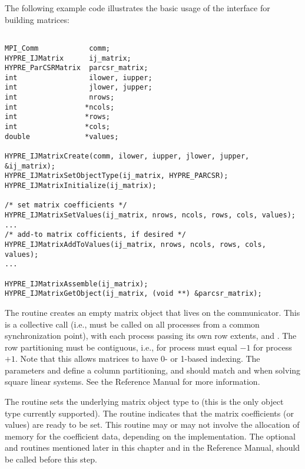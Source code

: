 The following example code illustrates the basic usage of the
 interface for building matrices:
\begin{display}
\begin{verbatim}

MPI_Comm            comm;
HYPRE_IJMatrix      ij_matrix;
HYPRE_ParCSRMatrix  parcsr_matrix;
int                 ilower, iupper;
int                 jlower, jupper;
int                 nrows;
int                *ncols;
int                *rows;
int                *cols;
double             *values;

HYPRE_IJMatrixCreate(comm, ilower, iupper, jlower, jupper, &ij_matrix);
HYPRE_IJMatrixSetObjectType(ij_matrix, HYPRE_PARCSR);
HYPRE_IJMatrixInitialize(ij_matrix);

/* set matrix coefficients */
HYPRE_IJMatrixSetValues(ij_matrix, nrows, ncols, rows, cols, values);
...
/* add-to matrix cofficients, if desired */
HYPRE_IJMatrixAddToValues(ij_matrix, nrows, ncols, rows, cols, values);
...

HYPRE_IJMatrixAssemble(ij_matrix);
HYPRE_IJMatrixGetObject(ij_matrix, (void **) &parcsr_matrix);

\end{verbatim}
\end{display}
The  routine creates an empty matrix object that lives
on the  communicator.  This is a collective call (i.e.,
must be called on all processes from a common synchronization point),
with each process passing its own row extents,  and
.  The row partitioning must be contiguous, i.e.,
 for process  must equal $-1$ for
process $+1$.  Note that this allows matrices to have 0- or
1-based indexing.  The parameters  and 
define a column partitioning, and should match  and
 when solving square linear systems.  See the Reference
Manual for more information.

The  routine sets the underlying matrix object
type to  (this is the only object type currently
supported).  The  routine indicates that the matrix
coefficients (or values) are ready to be set.  This routine may or may
not involve the allocation of memory for the coefficient data,
depending on the implementation.  The optional 
and  routines
mentioned later in this chapter and in the Reference Manual, should be
called before this step.

